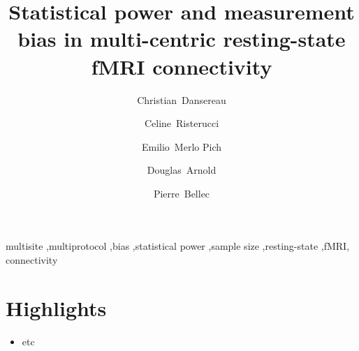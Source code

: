 \documentclass[authoryear]{elsarticle}
\begin{document}
\begin{frontmatter}

\title{Statistical power and measurement bias in multi-centric resting-state fMRI connectivity}



\author[a,b]{Christian~Dansereau}
\author[c]{Celine~Risterucci}
\author[c]{Emilio~Merlo Pich}
\author[d]{Douglas~Arnold}
\author[a,b]{Pierre~Bellec}
\address[a]{Centre de Recherche de l'Institut Universitaire de G\'eriatrie de Montr\'eal, Montr\'eal, CA}
\address[b]{D\'epartement d'Informatique et de recherche op\'erationnelle, Universit\'e de Montr\'eal, Montr\'eal,CA}
\address[c]{F. Hoffmann-La Roche Ldt., Basel, Switzerland}
\address[d]{NeuroRx, Montreal, Quebec, Canada}

\begin{abstract}


\end{abstract}

\begin{keyword}
multisite \sep multiprotocol \sep bias \sep statistical power \sep sample size \sep resting-state \sep fMRI, connectivity
\end{keyword}
\end{frontmatter}


\section*{Highlights}

\begin{itemize}
\item etc
\end{itemize}
\end{document}
